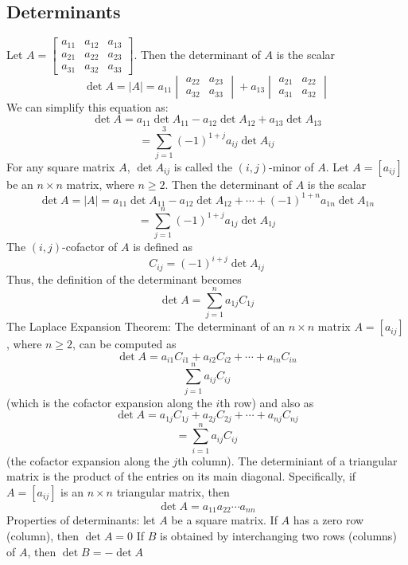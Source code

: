 \documentclass{article}
\begin{document}
        \subsection{Determinants}
        \begin{outline}
            \1 Let \(A = \begin{bmatrix}
                a_{11} & a_{12} & a_{13} \\ a_{21} & a_{22} & a_{23} \\ a_{31} & a_{32} & a_{33}
            \end{bmatrix}\). Then the determinant of $A$ is the scalar \[\det A = |A| = a_{11}\begin{vmatrix}
                a_{22} & a_{23} \\ a_{32} & a_{33}
            \end{vmatrix}+a_{13}\begin{vmatrix}
                a_{21} & a_{22} \\ a_{31} & a_{32}
            \end{vmatrix}\]
            \1 We can simplify this equation as: \[\det A=a_{11}\det A_{11} - a_{12}\det A_{12}+a_{13}\det A_{13}\]\[=\sum^3_{j=1}(-1)^{1+j}a_{ij}\det A_{ij}\]
            \1 For any square matrix $A$, \(\det A_{ij}\) is called the \((i,j)\)-minor of $A$. 
            \1 Let \(A=[a_{ij}]\) be an \(n\times n\) matrix, where \(n\geq 2\). Then the determinant of $A$ is the scalar \[\det A=|A|=a_{11}\det A_{11}-a_{12}\det A_{12}+\cdots+(-1)^{1+n}a_{1n}\det A_{1n}\]\[=\sum^n_{j=1}(-1)^{1+j}a_{1j}\det A_{1j}\]
            \1 The \((i,j)\)-cofactor of $A$ is defined as \[C_{ij}=(-1)^{i+j}\det A_{ij}\]
            \1 Thus, the definition of the determinant becomes \[\det A=\sum^n_{j=1}a_{1j}C_{1j}\]
            \1 The Laplace Expansion Theorem: The determinant of an \(n\times n\) matrix \(A=[a_{ij}]\), where \(n\geq 2\), can be computed as \[\det A=a_{i1}C_{i1}+a_{i2}C_{i2}+\cdots+a_{in}C_{in}\]\[\sum^n_{j=1}a_{ij}C_{ij}\] (which is the cofactor expansion along the $i$th row) and also as \[\det A=a_{1j}C_{1j}+a_{2j}C_{2j}+\cdots+a_{nj}C_{nj}\]\[=\sum^n_{i=1}a_{ij}C_{ij}\] (the cofactor expansion along the $j$th column). 
            \1 The determiniant of a triangular matrix is the product of the entries on its main diagonal. Specifically, if \(A=[a_{ij}]\) is an \(n\times n\) triangular matrix, then \[\det A=a_{11}a_{22}\cdots a_{nn}\]
            \1 Properties of determinants: let \(A\) be a square matrix. 
                \2 If $A$ has a zero row (column), then \(\det A=0\)
                \2 If $B$ is obtained by interchanging two rows (columns) of $A$, then \(\det B=-\det A\)

\end{outline}
\end{document}
